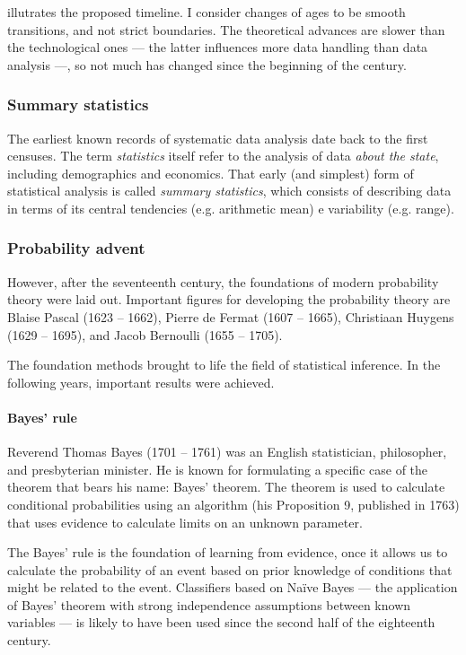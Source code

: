  illutrates the proposed timeline.  I consider changes of
ages to be smooth transitions, and not strict boundaries.  The theoretical advances are
slower than the technological ones --- the latter influences more data handling than data
analysis ---, so not much has changed since the beginning of the  century.

\subsubsection{Summary statistics}

The earliest known records of systematic data analysis date back to the first censuses.
The term \emph{statistics} itself refer to the analysis of data \emph{about the state},
including demographics and economics.  That early (and simplest) form of statistical
analysis is called \emph{summary statistics}, which consists of describing data in terms
of its central tendencies (e.g. arithmetic mean) e variability (e.g. range).

\subsubsection{Probability advent}

However, after the seventeenth century, the foundations of modern probability theory were
laid out.  Important figures for developing the probability theory are Blaise Pascal (1623
-- 1662), Pierre de Fermat (1607 -- 1665), Christiaan Huygens (1629 -- 1695), and Jacob
Bernoulli (1655 -- 1705).

The foundation methods brought to life the field of statistical inference. In the
following years, important results were achieved.

\paragraph{Bayes' rule}

Reverend Thomas Bayes (1701 -- 1761) was an English statistician, philosopher, and
presbyterian minister.  He is known for formulating a specific case of the theorem that
bears his name: Bayes' theorem.  The theorem is used to calculate conditional
probabilities using an algorithm (his Proposition 9, published in 1763) that uses evidence to calculate
limits on an unknown parameter.

The Bayes' rule is the foundation of learning from evidence, once it allows us to
calculate the probability of an event based on prior knowledge of conditions that might be
related to the event.  Classifiers based on Naïve Bayes --- the application of Bayes'
theorem with strong independence assumptions between known variables --- is likely to have
been used since the second half of the eighteenth century.

